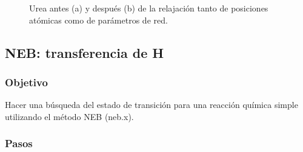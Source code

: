   \begin{figure}[H]
      \centering
       \caption{Urea antes (a) y después (b) de la relajación tanto de posiciones atómicas como de parámetros de red.}
   \end{figure}

\subsection{NEB: transferencia de H}

\subsubsection{Objetivo}

  Hacer una búsqueda del estado de transición para una reacción química simple utilizando el método NEB (neb.x).

\subsubsection{Pasos}

